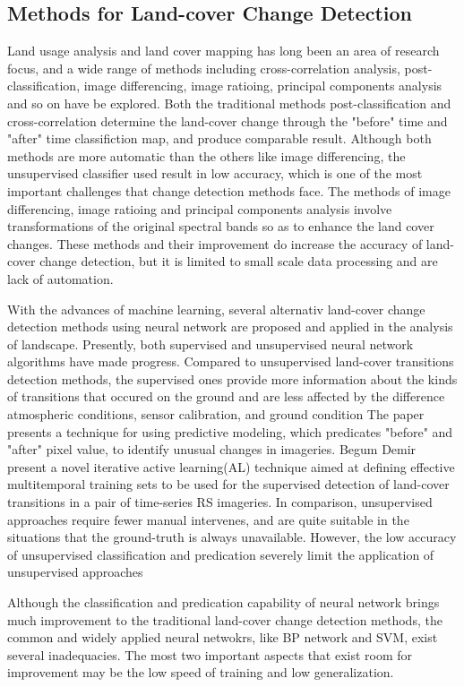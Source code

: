 \documentclass{elsart}
\begin{document}
\subsection{Methods for Land-cover Change Detection}
Land usage analysis and land cover mapping has long been an area of research focus, and a wide range of methods including cross-correlation analysis, post-classification, image differencing, image ratioing, principal components analysis and so on have be explored.
Both the traditional methods post-classification and cross-correlation determine the land-cover change through the "before" time and "after" time classifiction map, and produce comparable result. 
Although both methods are more automatic than the others like image differencing, the unsupervised classifier used result in low accuracy, which is one of the most important challenges that change detection methods face.
The methods of image differencing, image ratioing and principal components analysis involve transformations of the original spectral bands so as to enhance the land cover changes.
These methods and their improvement do increase the accuracy of land-cover change detection, but it is limited to small scale data processing and are lack of automation. 
\par

With the advances of machine learning, several alternativ land-cover change detection methods using neural network are proposed and applied in the analysis of landscape. 
Presently, both supervised and unsupervised neural network algorithms have made progress.
Compared to unsupervised land-cover transitions detection methods, the supervised ones provide more information about the kinds of transitions that occured on the ground and are less affected by the difference atmospheric conditions, sensor calibration, and ground condition\cite{Demir2011}\cite{Clifton2003}
The paper\cite{Clifton2003} presents a technique for using predictive modeling, which predicates "before" and "after" pixel value, to identify unusual changes in imageries.
Begum Demir\cite{Demir2011} present a novel iterative active learning(AL) technique aimed at defining effective multitemporal training sets to be used for the supervised detection of land-cover transitions in a pair of time-series RS imageries.
In comparison, unsupervised approaches require fewer manual intervenes\cite{Patra2006}\cite{Patra2007}\cite{Chen2008}, and are quite suitable in the situations that the ground-truth is always unavailable.
However, the low accuracy of unsupervised classification and predication severely limit the application of unsupervised approaches\par
Although the classification and predication capability of neural network brings much improvement to the traditional land-cover change detection methods, the common and widely applied neural netwokrs, like BP network and SVM, exist several inadequacies.
The most two important aspects that exist room for improvement may be the low speed of training and low generalization.
\end{document}
